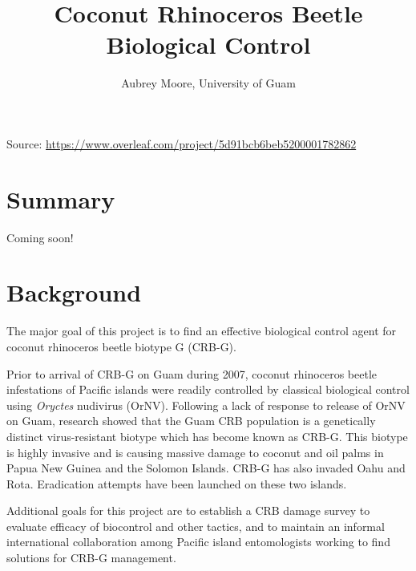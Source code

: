 \documentclass[12pt,letterpaper,english]{scrartcl}
\begin{document}
\titlehead{USDA APHIS Grant AP18PPQFO000C402\\
Progress Report 2\\
Report ID: AP18PPQFO000-PE-SA2-19\\
Performance Period: March 1, 2019 - August 31, 2019}
\title{Coconut Rhinoceros Beetle Biological Control}
\author{Aubrey Moore, University of Guam}
\maketitle

Source: \url{https://www.overleaf.com/project/5d91bcb6beb5200001782862}

\newpage
\tableofcontents{}




\newpage
\section{Summary}

Coming soon!




\newpage
\section{Background}

The major goal of this project is to find an effective biological
control agent for coconut rhinoceros beetle biotype G (CRB-G). 

Prior to arrival of CRB-G on Guam during 2007, coconut rhinoceros beetle
infestations of Pacific islands were readily controlled by classical
biological control using \textit{Oryctes} nudivirus (OrNV). Following a lack
of response to release of OrNV on Guam, research showed that the Guam
CRB population is a genetically distinct virus-resistant biotype which
has become known as CRB-G. This biotype is highly invasive and is
causing massive damage to coconut and oil palms in Papua New Guinea
and the Solomon Islands. CRB-G has also invaded Oahu and Rota. Eradication
attempts have been launched on these two islands. 

Additional goals for this project are to establish a CRB damage survey to evaluate efficacy of biocontrol and other tactics, and to maintain an informal international collaboration
among Pacific island entomologists working to find solutions for CRB-G
management. 
\end{document}
